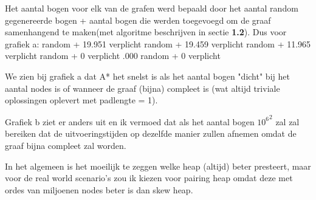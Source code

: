 \documentclass[12pt,a4paper,fleqn]{report}
\begin{document}
	Het aantal bogen voor elk van de grafen werd bepaald door het aantal random
	gegenereerde bogen + aantal bogen die werden toegevoegd om de graaf
	samenhangend te maken(met algoritme beschrijven in sectie \textbf{1.2}).
	Dus voor grafiek a: random + 19.951 verplicht  random + 19.459 verplicht  random + 11.965 verplicht  random + 0 verplicht .000 random + 0 verplicht \newline

	We zien bij grafiek a dat A* het snelst is als het aantal bogen "dicht" bij het aantal
	nodes is of wanneer de graaf (bijna) compleet is (wat altijd triviale oplossingen
	oplevert met padlengte = 1).

	Grafiek b ziet er anders uit en ik vermoed dat als het aantal bogen ${10^6}^2$ zal
	zal bereiken dat de uitvoeringstijden op dezelfde manier zullen afnemen omdat de graaf
	bijna compleet zal worden.

	In het algemeen is het moeilijk te zeggen welke heap (altijd) beter presteert, maar voor
	de real world scenario's zou ik kiezen voor pairing heap omdat deze met ordes van
	miljoenen nodes beter is dan skew heap.
\end{document}
